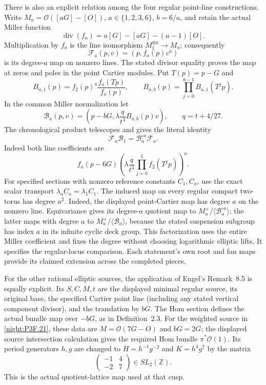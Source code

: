 \begin{remark}
There is also an explicit relation among the four regular point-line
constructions. Write $M_a=\mathcal O([aG]-[O])$, $a\in\{1,2,3,6\}$,
$b=6/a$, and retain the actual Miller function
\[
 \operatorname{div}(f_a)=a[G]-[aG]-(a-1)[O].
\]
Multiplication by $f_a$ is the line isomorphism
$M_1^{\otimes a}\longrightarrow M_a$; consequently
\[
 \mathcal F_a(p,v)=(p,f_a(p)v^a)
\]
is its degree-$a$ map on nonzero lines. The stated divisor equality
proves the map at zeros and poles in the point Cartier modules.
Put $T(p)=p-G$ and
\[
 B_{a,1}(p)=f_2(p)^a\frac{f_a(Tp)}{f_a(p)},\qquad
 B_{a,b}(p)=\prod_{j=0}^{b-1}B_{a,1}(T^jp).
\]
In the common Miller normalization let
\[
 \mathcal B_a(p,v)=
 \left(p-bG,\lambda\frac{q}{t^3}B_{a,b}(p)v\right),
 \qquad q=t+4/27.
\]
The chronological product telescopes and gives the literal identity
\[
 \mathcal F_a\mathcal B_1=\mathcal B_a^{\circ a}\mathcal F_a.
\]
Indeed both line coefficients are
\[
 f_a(p-6G)
 \left(\lambda\frac q{t^3}
       \prod_{j=0}^{5}f_2(T^jp)\right)^a.
\]
For specified sections with nonzero reference constants $C_1,C_a$,
use the exact scalar transport $\lambda_a C_a=\lambda_1 C_1$.
The induced map on every regular compact two-torus has degree $a^2$.
Indeed, the displayed point-Cartier map has degree $a$ on the nonzero
line. Equivariance gives its degree-$a$ quotient map to
$M_a^\times/\langle\mathcal B_a^{\circ a}\rangle$; the latter maps
with degree $a$ to $M_a^\times/\langle\mathcal B_a\rangle$, because
the stated suspension subgroup has index $a$ in its infinite cyclic
deck group. This factorization uses the entire Miller coefficient and
fixes the degree without choosing logarithmic elliptic lifts. It
specifies the regular-locus comparison. Each statement's own root and
fan maps provide its claimed extension across the completed pieces.

For the other rational elliptic sources, the application of Engel's
Remark~8.5 is equally explicit. Its $S,C,M,t$ are the displayed
minimal regular source, its original base, the specified Cartier point
line (including any stated vertical component divisor), and the
translation by $bG$. The Hom section defines the actual bundle map
over $-bG$, as in Definition~2.3. For the weighted source in
\cref{night:P3F.21}, these data are $M=\mathcal O(7G-O)$ and
$bG=2G$; the displayed source intersection calculation gives the
required Hom bundle $\pi^*\mathcal O(1)$. Its period generators
$h,g$ are changed to $H=h^{-1}g^{-2}$ and $K=h^4g^7$ by the
matrix
\[
 \begin{pmatrix}-1&4\\-2&7\end{pmatrix}\in SL_2(\mathbb Z).
\]
This is the actual quotient-lattice map used at that cusp.


\end{remark}
